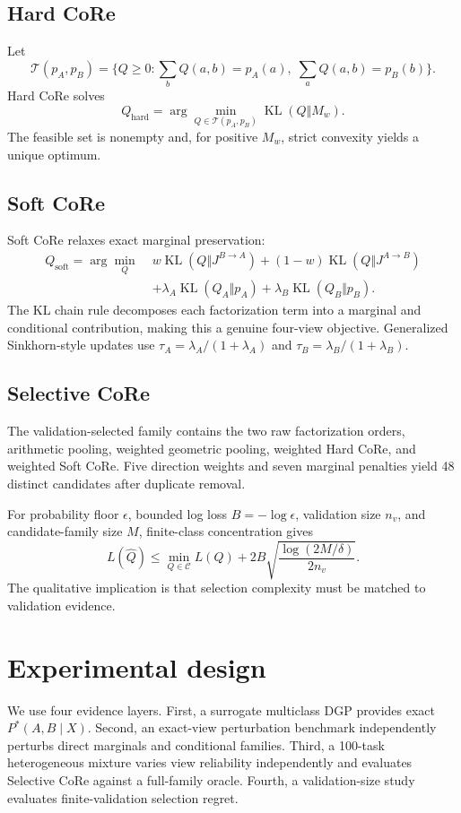 \documentclass[pdflatex,sn-basic]{sn-jnl}
\newcommand{\KL}{\operatorname{KL}}
\newcommand{\Jone}{J^{B\rightarrow A}}
\newcommand{\Jtwo}{J^{A\rightarrow B}}
\newcommand{\hardcore}{Q_{\mathrm{hard}}}
\newcommand{\softcore}{Q_{\mathrm{soft}}}
\theoremstyle{plain}
\begin{document}
\subsection{Hard CoRe}
Let
\begin{equation}
\mathcal{T}(p_A,p_B)=\{Q\ge0:\sum_bQ(a,b)=p_A(a),\;\sum_aQ(a,b)=p_B(b)\}.
\end{equation}
Hard CoRe solves
\begin{equation}
\hardcore=\arg\min_{Q\in\mathcal{T}(p_A,p_B)}\KL(Q\Vert M_w).
\end{equation}
The feasible set is nonempty and, for positive $M_w$, strict convexity yields a unique optimum.

\subsection{Soft CoRe}
Soft CoRe relaxes exact marginal preservation:
\begin{align}
\softcore=\arg\min_Q\;&w\KL(Q\Vert\Jone)+(1-w)\KL(Q\Vert\Jtwo)\nonumber\\
&+\lambda_A\KL(Q_A\Vert p_A)+\lambda_B\KL(Q_B\Vert p_B).
\end{align}
The KL chain rule decomposes each factorization term into a marginal and conditional contribution, making this a genuine four-view objective. Generalized Sinkhorn-style updates use $\tau_A=\lambda_A/(1+\lambda_A)$ and $\tau_B=\lambda_B/(1+\lambda_B)$.

\subsection{Selective CoRe}
The validation-selected family contains the two raw factorization orders, arithmetic pooling, weighted geometric pooling, weighted Hard CoRe, and weighted Soft CoRe. Five direction weights and seven marginal penalties yield 48 distinct candidates after duplicate removal.

For probability floor $\epsilon$, bounded log loss $B=-\log\epsilon$, validation size $n_v$, and candidate-family size $M$, finite-class concentration gives
\begin{equation}
L(\hat Q)\le\min_{Q\in\mathcal{C}}L(Q)+2B\sqrt{\frac{\log(2M/\delta)}{2n_v}}.
\end{equation}
The qualitative implication is that selection complexity must be matched to validation evidence.

\section{Experimental design}\label{sec:experiments}
We use four evidence layers. First, a surrogate multiclass DGP provides exact $P^*(A,B\mid X)$. Second, an exact-view perturbation benchmark independently perturbs direct marginals and conditional families. Third, a 100-task heterogeneous mixture varies view reliability independently and evaluates Selective CoRe against a full-family oracle. Fourth, a validation-size study evaluates finite-validation selection regret.
\end{document}
